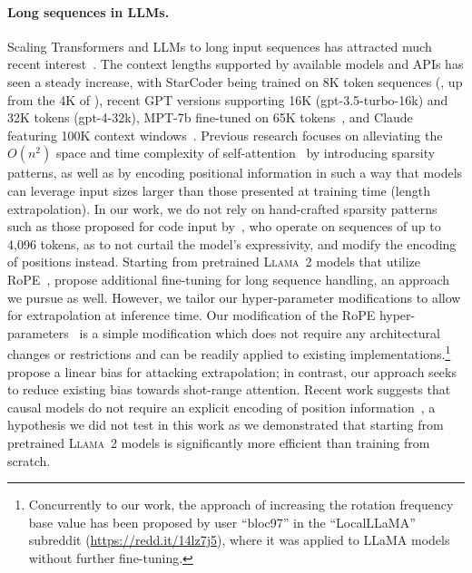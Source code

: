 \paragraph{Long sequences in LLMs.} Scaling Transformers and LLMs to long input sequences has attracted much recent interest~\citep{dai2019transformerxl,beltagy2020longformer,yu2023megabyte,ding2023longnet}. The context lengths supported by available models and APIs has seen a steady increase, with StarCoder being trained on 8K token sequences (\citep{li2023starcoder}, up from the 4K of \citet{allal2023santacoder}), recent GPT versions supporting 16K (gpt-3.5-turbo-16k) and 32K tokens (gpt-4-32k), MPT-7b fine-tuned on 65K tokens~\citep{themosaicmlnlpteam2023introducing}, and Claude featuring 100K context windows~\citep{anthropic2023introducing}. Previous research focuses on alleviating the $O(n^2)$ space and time complexity of self-attention~\citep{vaswani2017attention} by introducing sparsity patterns, as well as by encoding positional information in such a way that models can leverage input sizes larger than those presented at training time (length extrapolation). In our work, we do not rely on hand-crafted sparsity patterns such as those proposed for code input by~\citet{guo2023longcoder}, who operate on sequences of up to 4,096 tokens, as to not curtail the model's expressivity, and modify the encoding of positions instead. Starting from pretrained \textsc{Llama~2} models that utilize RoPE~\citep{su2021roformer}, \citet{chen2023extending} propose additional fine-tuning for long sequence handling, an approach we pursue as well. However, we tailor our hyper-parameter modifications to allow for extrapolation at inference time. Our modification of the RoPE hyper-parameters~\citep{su2021roformer} is a simple modification which does not require any architectural changes or restrictions and can be readily applied to existing implementations.\footnote{Concurrently to our work, the approach of increasing the rotation frequency base value has been proposed by user ``bloc97'' in the ``LocalLLaMA'' subreddit (\url{https://redd.it/14lz7j5}), where it was applied to LLaMA models without further fine-tuning.}
\citet{press2021train} propose a linear bias for attacking extrapolation; in contrast, our approach seeks to reduce existing bias towards shot-range attention. Recent work suggests that causal models do not require an explicit encoding of position information~\citep{haviv2022transformer,kazemnejad2023impact}, a hypothesis we did not test in this work as we demonstrated that starting from pretrained \textsc{Llama~2} models is significantly more efficient than training from scratch.


